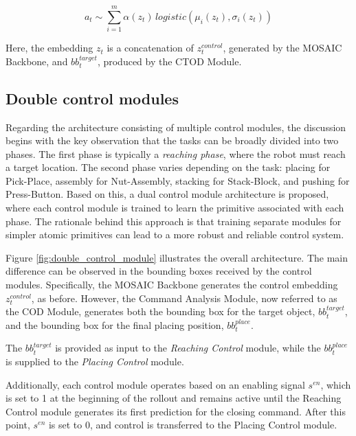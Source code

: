 \begin{equation}
    \label{equation:logistic_distribution}
    a_{t} \sim \sum_{i=1}^{m} \alpha(z_t) \, logistic(\mu_{i}(z_t), \sigma_{i}(z_t))
\end{equation}

Here, the embedding $z_t$ is a concatenation of $z^{control}_{t}$, generated by the MOSAIC Backbone, and $bb^{target}_t$, produced by the CTOD Module.



\subsection{Double control modules}
\label{sec:ocpl_architecture_dcm}
Regarding the architecture consisting of multiple control modules, the discussion begins with the key observation that the tasks can be broadly divided into two phases. The first phase is typically a \textit{reaching phase}, where the robot must reach a target location. The second phase varies depending on the task: placing for Pick-Place, assembly for Nut-Assembly, stacking for Stack-Block, and pushing for Press-Button. Based on this, a dual control module architecture is proposed, where each control module is trained to learn the primitive associated with each phase. The rationale behind this approach is that training separate modules for simpler atomic primitives can lead to a more robust and reliable control system.

Figure \ref{fig:double_control_module} illustrates the overall architecture. The main difference can be observed in the bounding boxes received by the control modules. Specifically, the MOSAIC Backbone generates the control embedding $z^{control}_t$, as before. However, the Command Analysis Module, now referred to as the COD Module, generates both the bounding box for the target object, $bb^{target}_t$, and the bounding box for the final placing position, $bb^{place}_t$. 

The $bb^{target}_t$ is provided as input to the \textit{Reaching Control} module, while the $bb^{place}_t$ is supplied to the \textit{Placing Control} module. 

Additionally, each control module operates based on an enabling signal $s^{en}$, which is set to 1 at the beginning of the rollout and remains active until the Reaching Control module generates its first prediction for the closing command. After this point, $s^{en}$ is set to 0, and control is transferred to the Placing Control module.    

